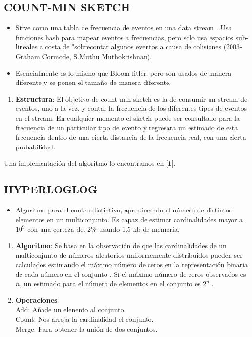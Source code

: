 \documentclass[journal]{IEEEtran}
\begin{document}
\begin{itemize}
\subsection{COUNT-MIN SKETCH}
\begin{itemize}
    \item Sirve como una tabla de frecuencia de eventos en una data stream . Usa funciones hash para mapear eventos a frecuencias, pero solo usa espacios sub-lineales a costa de "sobrecontar algunos eventos a causa de colisiones (2003-Graham Cormode, S.Muthu Muthokrishnan).
    \item Esencialmente es lo mismo que Bloom fitler, pero son usados de manera diferente y se ponen el tamaño de manera diferente.
\end{itemize}
\begin{enumerate}
    \item {\bf Estructura}: El objetivo de count-min sketch es la de consumir un stream de eventos, uno a la vez, y contar la frecuencia de los diferentes tipos de eventos en el stream. En cualquier momento el sketch puede ser consultado para la frecuencia de un particular tipo de evento y regresará un estimado de esta frecuencia dentro de una cierta distancia de la frecuencia real, con una cierta probabilidad.
\end{enumerate}


Una implementaci\'on del algoritmo lo encontramos en $\textbf{[1]}.$

\subsection{HYPERLOGLOG}
\begin{itemize}
    \item Algoritmo para el conteo distintivo, aproximando el n\'umero de distintos elementos en un multiconjunto. Es capaz de estimar cardinalidades mayor a $10^9$ con una certeza del 2\% usando 1,5 kb de memoria.
\end{itemize}
\begin{enumerate}
    \item {\bf Algoritmo}: Se basa en la observación de que las cardinalidades de un multiconjunto de n\'umeros aleatorios uniformemente distribuidos pueden ser calculados estimando el m\'aximo n\'umero de ceros en la representación binaria de cada n\'umero en el conjunto . Si el m\'aximo n\'umero de ceros observados es $n$, un estimado para el n\'umero de elementos en el conjunto es $2^n$ .
    \item {\bf Operaciones} \\
    Add: Añade un elenento al conjunto.\\
    Count: Nos arroja la cardinalidad el conjunto.\\
     Merge: Para obtener la unión de dos conjuntos.
\end{enumerate}
\end{itemize}
\end{document}

